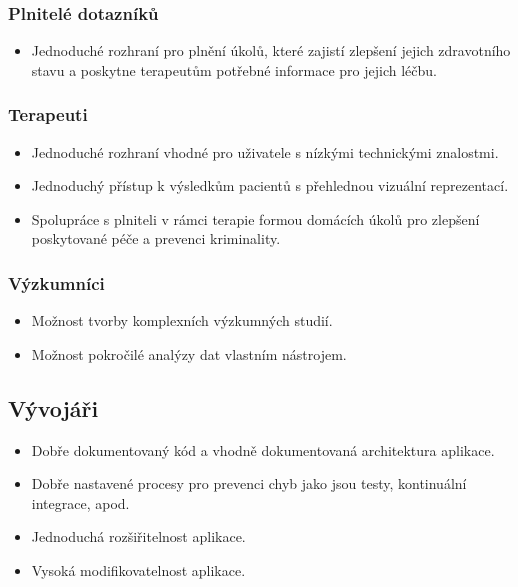 \subsubsection*{Plnitelé dotazníků}\label{subsubsec:plnitele}

\begin{itemize}
    \item
    Jednoduché rozhraní pro plnění úkolů, které zajistí zlepšení jejich zdravotního stavu a poskytne terapeutům potřebné informace pro jejich léčbu.
\end{itemize}

\subsubsection*{Terapeuti}\label{subsubsec:terapeuti}

\begin{itemize}
    \item
    Jednoduché rozhraní vhodné pro uživatele s nízkými technickými znalostmi.
    \item
    Jednoduchý přístup k výsledkům pacientů s přehlednou vizuální reprezentací.
    \item
    Spolupráce s plniteli v rámci terapie formou domácích úkolů pro zlepšení poskytované péče a prevenci kriminality.
\end{itemize}

\subsubsection*{Výzkumníci}\label{subsubsec:vyzkumnici}

\begin{itemize}
    \item
    Možnost tvorby komplexních výzkumných studií.
    \item
    Možnost pokročilé analýzy dat vlastním nástrojem.
\end{itemize}

\subsection*{Vývojáři}\label{subsec:vyvojari}

\begin{itemize}
    \item
    Dobře dokumentovaný kód a vhodně dokumentovaná architektura aplikace.
    \item
    Dobře nastavené procesy pro prevenci chyb jako jsou testy, kontinuální integrace, apod.
    \item
    Jednoduchá rozšiřitelnost aplikace.
    \item
    Vysoká modifikovatelnost aplikace.
\end{itemize}

